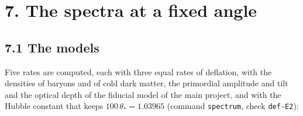 \documentclass[
  10pt,
]{article}
\begin{document}
\hypertarget{the-spectra-at-a-fixed-angle}{%
\section{7. The spectra at a fixed
angle}\label{the-spectra-at-a-fixed-angle}}

\hypertarget{the-models}{%
\subsection{7.1 The models}\label{the-models}}

Five rates are computed, each with three equal rates of deflation, with
the densities of baryons and of cold dark matter, the primordial
amplitude and tilt and the optical depth of the fiducial model of the
main project, and with the Hubble constant that keeps
\(100\,\theta_*=1.03965\) (command \texttt{spectrum}, check
\texttt{def-E2}):
\end{document}
